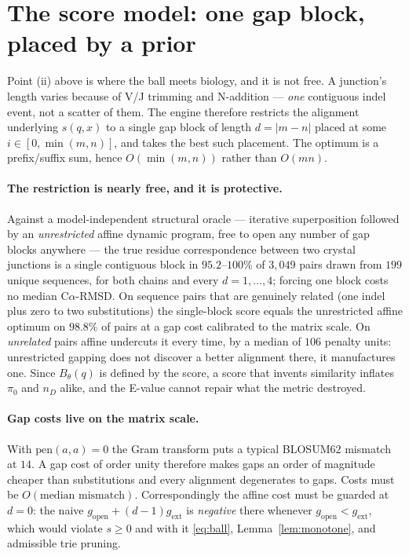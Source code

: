 \documentclass[11pt]{article}
\theoremstyle{oldplain}
\theoremstyle{oldrem}
\newcommand{\ball}[2]{B_{#1}(#2)}
\begin{document}
\section{The score model: one gap block, placed by a prior}\label{sec:gapblock}

Point (ii) above is where the ball meets biology, and it is not free. A junction's length varies
because of V/J trimming and N-addition --- \emph{one} contiguous indel event, not a scatter of them.
The engine therefore restricts the alignment underlying $s(q,x)$ to a single gap block of length
$d=\lvert m-n\rvert$ placed at some $i \in [0,\min(m,n)]$, and takes the best such placement. The
optimum is a prefix/suffix sum, hence $O(\min(m,n))$ rather than $O(mn)$.

\paragraph{The restriction is nearly free, and it is protective.} Against a model-independent
structural oracle --- iterative superposition followed by an \emph{unrestricted} affine dynamic
program, free to open any number of gap blocks anywhere --- the true residue correspondence between
two crystal junctions is a single contiguous block in $95.2$--$100\%$ of $3{,}049$ pairs drawn from
$199$ unique sequences, for both chains and every $d=1,\dots,4$; forcing one block costs no median
$\mathrm{C}\alpha$-RMSD. On sequence pairs that are genuinely related (one indel plus zero to two
substitutions) the single-block score equals the unrestricted affine optimum on $98.8\%$ of pairs at
a gap cost calibrated to the matrix scale. On \emph{unrelated} pairs affine undercuts it every time,
by a median of $106$ penalty units: unrestricted gapping does not discover a better alignment there,
it manufactures one. Since $\ball{\theta}{q}$ is defined by the score, a score that invents
similarity inflates $\pi_0$ and $n_D$ alike, and the E-value cannot repair what the metric destroyed.

\paragraph{Gap costs live on the matrix scale.} With $\mathrm{pen}(a,a)=0$ the Gram transform puts a
typical BLOSUM62 mismatch at $14$. A gap cost of order unity therefore makes gaps an order of
magnitude cheaper than substitutions and every alignment degenerates to gaps. Costs must be
$O(\text{median mismatch})$. Correspondingly the affine cost must be guarded at $d=0$: the naive
$g_{\text{open}} + (d-1)g_{\text{ext}}$ is \emph{negative} there whenever
$g_{\text{open}} < g_{\text{ext}}$, which would violate $s\ge 0$ and with it \eqref{eq:ball},
Lemma~\ref{lem:monotone}, and admissible trie pruning.
\end{document}

